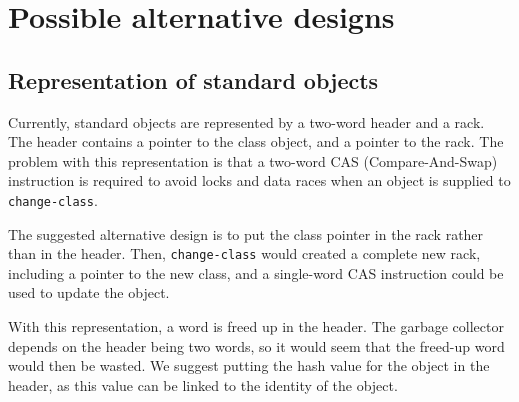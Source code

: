 \chapter{Possible alternative designs}

\section{Representation of standard objects}

Currently, standard objects are represented by a two-word header and a
rack.  The header contains a pointer to the class object, and a
pointer to the rack.  The problem with this representation is that a
two-word CAS (Compare-And-Swap) instruction is required to avoid locks
and data races when an object is supplied to \texttt{change-class}.

The suggested alternative design is to put the class pointer in the
rack rather than in the header.  Then, \texttt{change-class} would
created a complete new rack, including a pointer to the new class, and
a single-word CAS instruction could be used to update the object.

With this representation, a word is freed up in the header.  The
garbage collector depends on the header being two words, so it would
seem that the freed-up word would then be wasted.  We suggest putting
the hash value for the object in the header, as this value can be
linked to the identity of the object.
